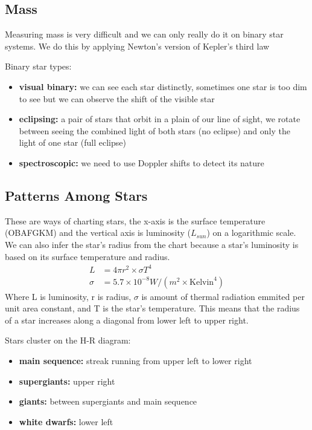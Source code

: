 \subsection{Mass}
Measuring mass is very difficult and we can only really do it on binary star systems. We do this by applying Newton's version of Kepler's third law

Binary star types:
\begin{itemize}
\item \textbf{visual binary: } we can see each star distinctly, sometimes one star is too dim to see but we can observe the shift of the visible star
\item \textbf{eclipsing: }  a pair of stars that orbit in a plain of our line of sight, we rotate between seeing the combined light of both stars (no eclipse) and only the light of one star (full eclipse)
\item \textbf{spectroscopic: } we need to use Doppler shifts to detect its nature
\end{itemize}

\subsection{Patterns Among Stars}
These are ways of charting stars, the x-axis is the surface temperature (OBAFGKM) and the vertical axis is luminosity ($L_{sun}$) on a logarithmic scale. We can also infer the star's radius from the chart because a star's luminosity is based on its surface temperature and radius.
\begin{align*}
L &= 4\pi r^2 \times \sigma T^4 \\
\sigma &= 5.7 \times 10^{-8} W/(m^2 \times \text{Kelvin}^4)
\end{align*}
Where L is luminosity, r is radius, $\sigma$ is amount of thermal radiation emmited per unit area constant, and T is the star's temperature. This means that the radius of a star increases along a diagonal from lower left to upper right.

Stars cluster on the H-R diagram:
\begin{itemize}
\item \textbf{main sequence: }streak running from upper left to lower right
\item \textbf{supergiants: }upper right
\item \textbf{giants: }between supergiants and main sequence
\item \textbf{white dwarfs: }lower left
\end{itemize}

